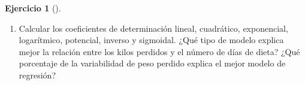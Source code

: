 \documentclass[
  a4paper,
]{scrreport}
\theoremstyle{definition}
\newtheorem{exercise}{Ejercicio}[chapter]
\theoremstyle{remark}
\begin{document}
\begin{exercise}[]
\begin{enumerate}
\begin{tcolorbox}
  \end{tcolorbox}
\item
  Calcular los coeficientes de determinación lineal, cuadrático,
  exponencial, logarítmico, potencial, inverso y sigmoidal. ¿Qué tipo de
  modelo explica mejor la relación entre los kilos perdidos y el número
  de días de dieta? ¿Qué porcentaje de la variabilidad de peso perdido
  explica el mejor modelo de regresión?

  \begin{tcolorbox}[enhanced jigsaw, coltitle=black, left=2mm, colback=white, leftrule=.75mm, toptitle=1mm, breakable, bottomrule=.15mm, titlerule=0mm, bottomtitle=1mm, title=\textcolor{quarto-callout-tip-color}{\faLightbulb}\hspace{0.5em}{Solución}, arc=.35mm, toprule=.15mm, rightrule=.15mm, colframe=quarto-callout-tip-color-frame, opacityback=0, colbacktitle=quarto-callout-tip-color!10!white, opacitybacktitle=0.6]


\end{tcolorbox}
\end{enumerate}
\end{exercise}
\end{document}
